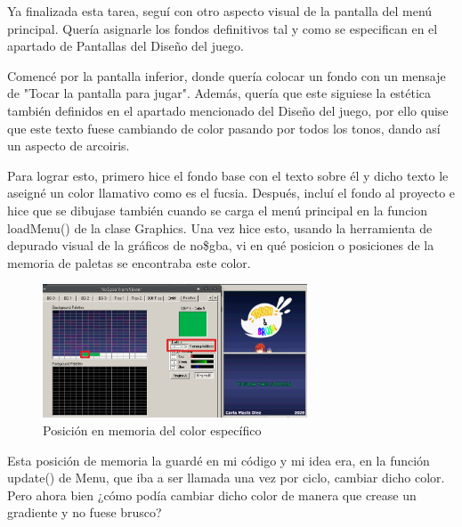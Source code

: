  \vspace{0.5cm}

Ya finalizada esta tarea, seguí con otro aspecto visual de la pantalla del menú principal. Quería asignarle los fondos definitivos tal y como se especifican en el apartado de Pantallas del Diseño del juego.

 \vspace{0.5cm}

Comencé por la pantalla inferior, donde quería colocar un fondo con un mensaje de "Tocar la pantalla para jugar". Además, quería que este siguiese la estética también definidos en el apartado mencionado del Diseño del juego, por ello quise que este texto fuese cambiando de color pasando por todos los tonos, dando así un aspecto de arcoiris.

 \vspace{0.5cm}

Para lograr esto, primero hice el fondo base con el texto sobre él y dicho texto le aseigné un color llamativo como es el fucsia. Después, incluí el fondo al proyecto e hice que se dibujase también cuando se carga el menú principal en la funcion loadMenu() de la clase Graphics. Una vez hice esto, usando la herramienta de depurado visual de la gráficos de no\$gba, vi en qué posicion o posiciones de la memoria de paletas se encontraba este color. 

 \vspace{0.5cm}

\begin{figure}[htbp]
\centering
  \includegraphics[width=0.7\textwidth]{archivos/palette_fade.png}
  \caption{Posición en memoria del color específico}
  \label{fig:palette_fade}
\end{figure}

 \vspace{0.5cm}

Esta posición de memoria la guardé en mi código y mi idea era, en la función update() de Menu, que iba a ser llamada una vez por ciclo, cambiar dicho color. Pero ahora bien ¿cómo podía cambiar dicho color de manera que crease un gradiente y no fuese brusco?

